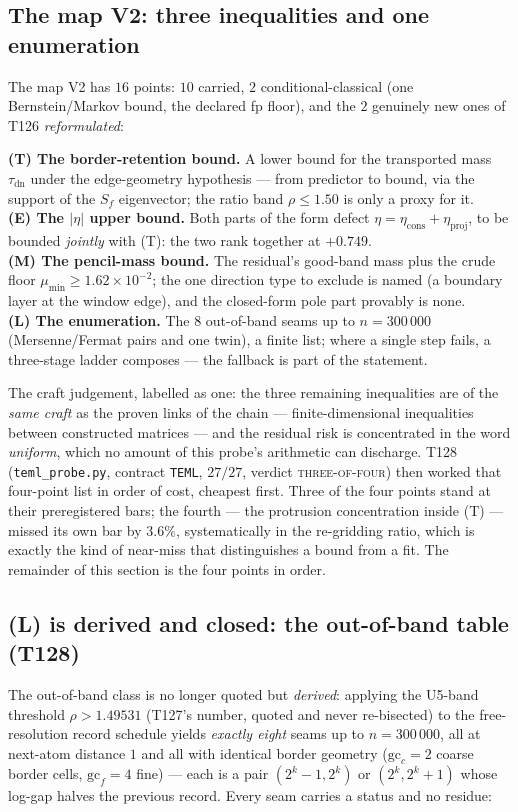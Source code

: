 \documentclass[11pt,a4paper]{article}
\begin{document}
\subsection{The map V2: three inequalities and one enumeration}
The map V2 has $16$ points: $10$ carried, $2$ conditional-classical (one Bernstein/Markov bound,
the declared fp floor), and the $2$ genuinely new ones of T126 \emph{reformulated}:

\begin{keybox}
\textbf{(T) The border-retention bound.} A lower bound for the transported mass
$\tau_{\mathrm{dn}}$ under the edge-geometry hypothesis --- from predictor to bound, via the
support of the $S_f$ eigenvector; the ratio band $\rho\le1.50$ is only a proxy for it.\\[3pt]
\textbf{(E) The $|\eta|$ upper bound.} Both parts of the form defect
$\eta=\eta_{\mathrm{cons}}+\eta_{\mathrm{proj}}$, to be bounded \emph{jointly} with (T): the two
rank together at $+0.749$.\\[3pt]
\textbf{(M) The pencil-mass bound.} The residual's good-band mass plus the crude floor
$\mu_{\min}\ge1.62\times10^{-2}$; the one direction type to exclude is named (a boundary layer at
the window edge), and the closed-form pole part provably is none.\\[3pt]
\textbf{(L) The enumeration.} The $8$ out-of-band seams up to $n=300\,000$ (Mersenne/Fermat pairs
and one twin), a finite list; where a single step fails, a three-stage ladder composes --- the
fallback is part of the statement.
\end{keybox}

\noindent The craft judgement, labelled as one: the three remaining inequalities are of the
\emph{same craft} as the proven links of the chain --- finite-dimensional inequalities between
constructed matrices --- and the residual risk is concentrated in the word \emph{uniform}, which
no amount of this probe's arithmetic can discharge. T128 (\texttt{teml\_probe.py}, contract
\texttt{TEML}, $27/27$, verdict \textsc{three-of-four}) then worked that four-point list in order
of cost, cheapest first. Three of the four points stand at their preregistered bars; the fourth
--- the protrusion concentration inside (T) --- missed its own bar by $3.6\%$, systematically in
the re-gridding ratio, which is exactly the kind of near-miss that distinguishes a bound from a
fit. The remainder of this section is the four points in order.

\subsection{(L) is derived and closed: the out-of-band table (T128)}
The out-of-band class is no longer quoted but \emph{derived}: applying the U5-band threshold
$\rho>1.49531$ (T127's number, quoted and never re-bisected) to the free-resolution record
schedule yields \emph{exactly eight} seams up to $n=300\,000$, all at next-atom distance $1$ and
all with identical border geometry ($\mathrm{gc}_c=2$ coarse border cells, $\mathrm{gc}_f=4$ fine)
--- each is a pair $(2^k{-}1,2^k)$ or $(2^k,2^k{+}1)$ whose log-gap halves the previous record.
Every seam carries a status and no residue:
\end{document}
